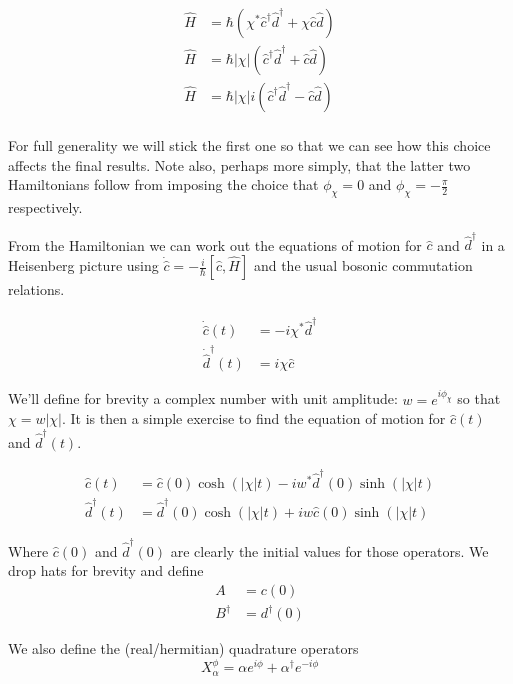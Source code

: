 \documentclass[12pt]{article}
\begin{document}
\begin{align*}
\hat{H} &= \hbar \left(\chi^* \hat{c}^{\dag}\hat{d}^{\dag} + \chi \hat{c} \hat{d}\right) \\
\hat{H} &= \hbar |\chi| \left(\hat{c}^{\dag}\hat{d}^{\dag} + \hat{c} \hat{d}\right) \\
\hat{H} &= \hbar |\chi| i \left(\hat{c}^{\dag}\hat{d}^{\dag} - \hat{c} \hat{d}\right) \\
\end{align*}

For full generality we will stick the first one so that we can see how this choice affects the final results. Note also, perhaps more simply, that the latter two Hamiltonians follow from imposing the choice that $\phi_{\chi}=0$ and $\phi_{\chi} = -\frac{\pi}{2}$ respectively.

From the Hamiltonian we can work out the equations of motion for $\hat{c}$ and $\hat{d}^{\dag}$ in a Heisenberg picture using $\dot{\hat{c}} = -\frac{i}{\hbar} [\hat{c},\hat{H}]$ and the usual bosonic commutation relations.

\begin{align*}
\dot{\hat{c}}(t) &= -i \chi^* \hat{d}^{\dag}\\
\dot{\hat{d}}^{\dag}(t) &= i \chi \hat{c}
\end{align*}

We'll define for brevity a complex number with unit amplitude: $w = e^{i\phi_{\chi}}$ so that $\chi = w|\chi|$. It is then a simple exercise to find the equation of motion for $\hat{c}(t)$ and $\hat{d}^{\dag}(t)$.

\begin{align}
\hat{c}(t) &= \hat{c}(0) \cosh\left(\left|\chi\right| t\right) - i w^* \hat{d}^{\dag}(0) \sinh\left(|\chi| t\right)\\
\hat{d}^{\dag}(t) &= \hat{d}^{\dag}(0) \cosh\left(|\chi| t\right) +i w \hat{c}(0)\sinh \left(|\chi| t\right)
\end{align}

Where $\hat{c}(0)$ and $\hat{d}^{\dag}(0)$ are clearly the initial values for those operators. We drop hats for brevity and define
\begin{align*}
A &= c(0)\\
B^{\dag} &= d^{\dag}(0)
\end{align*}

We also define the (real/hermitian) quadrature operators 
\begin{equation}
X_{\alpha}^{\phi} = \alpha e^{i \phi} + \alpha^{\dag} e^{-i \phi}
\end{equation}
\end{document}
